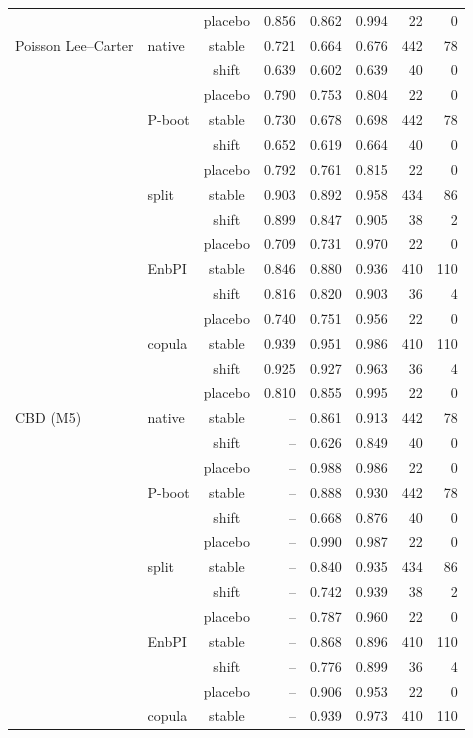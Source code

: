 {\begin{longtable}{@{}llcrrrrr@{}}
 &  & placebo & 0.856 & 0.862 & 0.994 & 22 & 0 \\
\addlinespace[2pt]
Poisson Lee--Carter & native & stable & 0.721 & 0.664 & 0.676 & 442 & 78 \\
 &  & shift & 0.639 & 0.602 & 0.639 & 40 & 0 \\
 &  & placebo & 0.790 & 0.753 & 0.804 & 22 & 0 \\
 & P-boot & stable & 0.730 & 0.678 & 0.698 & 442 & 78 \\
 &  & shift & 0.652 & 0.619 & 0.664 & 40 & 0 \\
 &  & placebo & 0.792 & 0.761 & 0.815 & 22 & 0 \\
 & split & stable & 0.903 & 0.892 & 0.958 & 434 & 86 \\
 &  & shift & 0.899 & 0.847 & 0.905 & 38 & 2 \\
 &  & placebo & 0.709 & 0.731 & 0.970 & 22 & 0 \\
 & EnbPI & stable & 0.846 & 0.880 & 0.936 & 410 & 110 \\
 &  & shift & 0.816 & 0.820 & 0.903 & 36 & 4 \\
 &  & placebo & 0.740 & 0.751 & 0.956 & 22 & 0 \\
 & copula & stable & 0.939 & 0.951 & 0.986 & 410 & 110 \\
 &  & shift & 0.925 & 0.927 & 0.963 & 36 & 4 \\
 &  & placebo & 0.810 & 0.855 & 0.995 & 22 & 0 \\
\addlinespace[2pt]
CBD (M5) & native & stable & -- & 0.861 & 0.913 & 442 & 78 \\
 &  & shift & -- & 0.626 & 0.849 & 40 & 0 \\
 &  & placebo & -- & 0.988 & 0.986 & 22 & 0 \\
 & P-boot & stable & -- & 0.888 & 0.930 & 442 & 78 \\
 &  & shift & -- & 0.668 & 0.876 & 40 & 0 \\
 &  & placebo & -- & 0.990 & 0.987 & 22 & 0 \\
 & split & stable & -- & 0.840 & 0.935 & 434 & 86 \\
 &  & shift & -- & 0.742 & 0.939 & 38 & 2 \\
 &  & placebo & -- & 0.787 & 0.960 & 22 & 0 \\
 & EnbPI & stable & -- & 0.868 & 0.896 & 410 & 110 \\
 &  & shift & -- & 0.776 & 0.899 & 36 & 4 \\
 &  & placebo & -- & 0.906 & 0.953 & 22 & 0 \\
 & copula & stable & -- & 0.939 & 0.973 & 410 & 110 \\

\end{longtable}}
